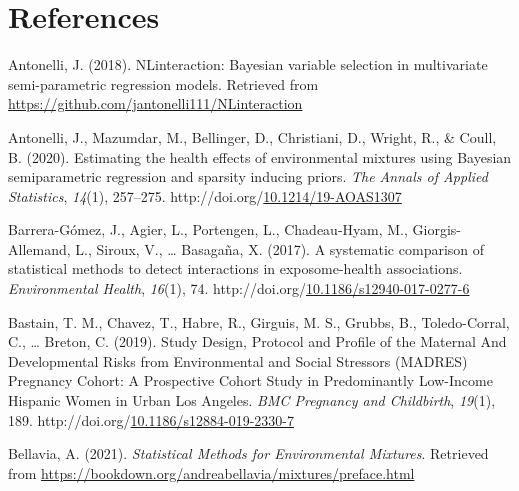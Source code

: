 \documentclass[12pt, twoside]{amherstthesis}
\newenvironment{CSLReferences}[2]%
  {}%
  {\par}
\begin{document}
\backmatter

\hypertarget{references}{%
\chapter*{References}\label{references}}

\noindent

\setlength{\parindent}{-0.20in}
\setlength{\leftskip}{0.20in}
\setlength{\parskip}{8pt}

\hypertarget{refs}{}
\begin{CSLReferences}{1}{0}
\leavevmode{}%
Antonelli, J. (2018). {NLinteraction}: {Bayesian} variable selection in multivariate semi-parametric regression models. Retrieved from \url{https://github.com/jantonelli111/NLinteraction}

\leavevmode{}%
Antonelli, J., Mazumdar, M., Bellinger, D., Christiani, D., Wright, R., \& Coull, B. (2020). Estimating the health effects of environmental mixtures using {Bayesian} semiparametric regression and sparsity inducing priors. \emph{The Annals of Applied Statistics}, \emph{14}(1), 257--275. http://doi.org/\href{https://doi.org/10.1214/19-AOAS1307}{10.1214/19-AOAS1307}

\leavevmode{}%
Barrera-Gómez, J., Agier, L., Portengen, L., Chadeau-Hyam, M., Giorgis-Allemand, L., Siroux, V., \ldots{} Basagaña, X. (2017). A systematic comparison of statistical methods to detect interactions in exposome-health associations. \emph{Environmental Health}, \emph{16}(1), 74. http://doi.org/\href{https://doi.org/10.1186/s12940-017-0277-6}{10.1186/s12940-017-0277-6}

\leavevmode{}%
Bastain, T. M., Chavez, T., Habre, R., Girguis, M. S., Grubbs, B., Toledo-Corral, C., \ldots{} Breton, C. (2019). Study {Design}, {Protocol} and {Profile} of the {Maternal} {And} {Developmental} {Risks} from {Environmental} and {Social} {Stressors} ({MADRES}) {Pregnancy} {Cohort}: A {Prospective} {Cohort} {Study} in {Predominantly} {Low}-{Income} {Hispanic} {Women} in {Urban} {Los} {Angeles}. \emph{BMC Pregnancy and Childbirth}, \emph{19}(1), 189. http://doi.org/\href{https://doi.org/10.1186/s12884-019-2330-7}{10.1186/s12884-019-2330-7}

\leavevmode{}%
Bellavia, A. (2021). \emph{Statistical {Methods} for {Environmental} {Mixtures}}. Retrieved from \url{https://bookdown.org/andreabellavia/mixtures/preface.html}


\end{CSLReferences}
\end{document}
